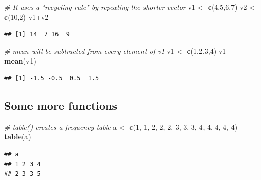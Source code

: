 \documentclass[]{book}
\newenvironment{Shaded}{\begin{snugshade}}{\end{snugshade}}
\newcommand{\KeywordTok}[1]{\textcolor[rgb]{0.13,0.29,0.53}{\textbf{{#1}}}}
\newcommand{\DecValTok}[1]{\textcolor[rgb]{0.00,0.00,0.81}{{#1}}}
\newcommand{\StringTok}[1]{\textcolor[rgb]{0.31,0.60,0.02}{{#1}}}
\newcommand{\CommentTok}[1]{\textcolor[rgb]{0.56,0.35,0.01}{\textit{{#1}}}}
\newcommand{\NormalTok}[1]{{#1}}
\begin{document}
\begin{Shaded}
\begin{Highlighting}[]
\CommentTok{# R uses a "recycling rule" by repeating the shorter vector}
\NormalTok{v1 <-}\StringTok{ }\KeywordTok{c}\NormalTok{(}\DecValTok{4}\NormalTok{,}\DecValTok{5}\NormalTok{,}\DecValTok{6}\NormalTok{,}\DecValTok{7}\NormalTok{)}
\NormalTok{v2 <-}\StringTok{ }\KeywordTok{c}\NormalTok{(}\DecValTok{10}\NormalTok{,}\DecValTok{2}\NormalTok{)}
\NormalTok{v1+v2}
\end{Highlighting}
\end{Shaded}

\begin{verbatim}
## [1] 14  7 16  9
\end{verbatim}

\begin{Shaded}
\begin{Highlighting}[]
\CommentTok{# mean will be subtracted from every element of v1}
\NormalTok{v1 <-}\StringTok{ }\KeywordTok{c}\NormalTok{(}\DecValTok{1}\NormalTok{,}\DecValTok{2}\NormalTok{,}\DecValTok{3}\NormalTok{,}\DecValTok{4}\NormalTok{)}
\NormalTok{v1 -}\StringTok{ }\KeywordTok{mean}\NormalTok{(v1)}
\end{Highlighting}
\end{Shaded}

\begin{verbatim}
## [1] -1.5 -0.5  0.5  1.5
\end{verbatim}

\subsection{Some more functions}\label{some-more-functions}

\begin{Shaded}
\begin{Highlighting}[]
\CommentTok{# table() creates a frequency table}
\NormalTok{a <-}\StringTok{ }\KeywordTok{c}\NormalTok{(}\DecValTok{1}\NormalTok{, }\DecValTok{1}\NormalTok{, }\DecValTok{2}\NormalTok{, }\DecValTok{2}\NormalTok{, }\DecValTok{2}\NormalTok{, }\DecValTok{3}\NormalTok{, }\DecValTok{3}\NormalTok{, }\DecValTok{3}\NormalTok{, }\DecValTok{4}\NormalTok{, }\DecValTok{4}\NormalTok{, }\DecValTok{4}\NormalTok{, }\DecValTok{4}\NormalTok{, }\DecValTok{4}\NormalTok{)}
\KeywordTok{table}\NormalTok{(a)}
\end{Highlighting}
\end{Shaded}

\begin{verbatim}
## a
## 1 2 3 4 
## 2 3 3 5
\end{verbatim}
\end{document}
